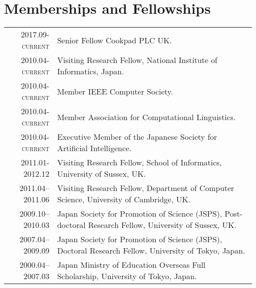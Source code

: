 \documentclass[a4paper,11pt]{article}
\begin{document}
\section{Memberships and Fellowships}
\begin{tabular}{r p{11cm}}
\textsc{2017.09-current} & Senior Fellow Cookpad PLC  UK. \\
\textsc{2010.04-current} & Visiting Research Fellow, National Institute of Informatics, Japan.\\
\textsc{2010.04-current} & Member IEEE Computer Society. \\
\textsc{2010.04-current} & Member Association for Computational Linguistics.\\
\textsc{2010.04-current} & Executive Member of the Japanese Society for Artificial Intelligence.\\
\textsc{2011.01-2012.12} & Visiting Research Fellow, School of Informatics, University of Sussex, UK.\\
\textsc{2011.04--2011.06} & Visiting Research Fellow, Department of Computer Science, University of Cambridge, UK. \\
\textsc{2009.10--2010.03} & Japan Society for Promotion of Science (JSPS), Post-doctoral Research Fellow, University of Sussex, UK. \\
\textsc{2007.04--2009.09} & Japan Society for Promotion of Science (JSPS), Doctoral Research Fellow, University of Tokyo, Japan.\\
\textsc{2000.04--2007.03} & Japan Ministry of Education Overseas Full Scholarship, University of Tokyo, Japan.
\end{tabular}


\end{document}
